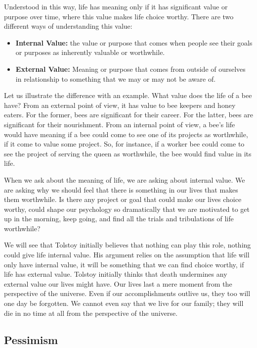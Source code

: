 \documentclass[10pt]{article}
\begin{document}
Understood in this way, life has meaning only if it has significant
value or purpose over time, where this value makes life choice worthy.
There are two different ways of understanding this value:

\begin{itemize}
\item
  \textbf{Internal Value:} the value or purpose that comes when people
  see their goals or purposes as inherently valuable or worthwhile.
\item
  \textbf{External Value:} Meaning or purpose that comes from outside of
  ourselves in relationship to something that we may or may not be aware
  of.
\end{itemize}

Let us illustrate the difference with an example. What value does the
life of a bee have? From an external point of view, it has value to bee
keepers and honey eaters. For the former, bees are significant for their
career. For the latter, bees are significant for their nourishment. From
an internal point of view, a bee's life would have meaning if a bee
could come to see one of its projects as worthwhile, if it come to value
some project. So, for instance, if a worker bee could come to see the
project of serving the queen as worthwhile, the bee would find value in
its life.

When we ask about the meaning of life, we are asking about internal
value. We are asking why we should feel that there is something in our
lives that makes them worthwhile. Is there any project or goal that
could make our lives choice worthy, could shape our psychology so
dramatically that we are motivated to get up in the morning, keep going,
and find all the trials and tribulations of life worthwhile?

We will see that Tolstoy initially believes that nothing can play this
role, nothing could give life internal value. His argument relies on the
assumption that life will only have internal value, it will be something
that we can find choice worthy, if life has external value. Tolstoy
initially thinks that death undermines any external value our lives
might have. Our lives last a mere moment from the perspective of the
universe. Even if our accomplishments outlive us, they too will one day
be forgotten. We cannot even say that we live for our family; they will
die in no time at all from the perspective of the universe.

\subsection{Pessimism}\label{pessimism}
\end{document}
